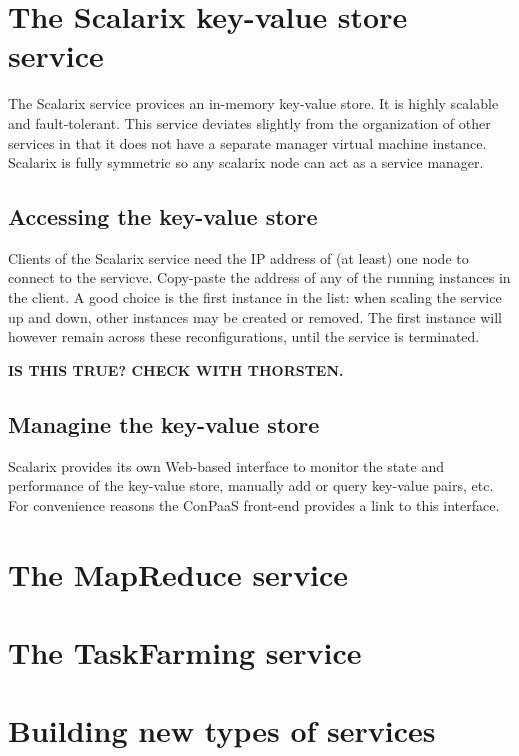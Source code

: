 \documentclass[10pt]{article}
\begin{document}
\section{The Scalarix key-value store service}

The Scalarix service provices an in-memory key-value store. It is
highly scalable and fault-tolerant. This service deviates slightly
from the organization of other services in that it does not have a
separate manager virtual machine instance. Scalarix is fully symmetric
so any scalarix node can act as a service manager.

\subsection{Accessing the key-value store}

Clients of the Scalarix service need the IP address of (at least) one
node to connect to the servicve. Copy-paste the address of any of the
running instances in the client. A good choice is the first instance
in the list: when scaling the service up and down, other instances may
be created or removed. The first instance will however remain across
these reconfigurations, until the service is terminated.

\textbf{IS THIS TRUE? CHECK WITH THORSTEN.}


\subsection{Managine the key-value store}

Scalarix provides its own Web-based interface to monitor the state and
performance of the key-value store, manually add or query key-value
pairs, etc. For convenience reasons the ConPaaS front-end provides a
link to this interface.

\section{The MapReduce service}



\section{The TaskFarming service}

\section{Building new types of services}
\end{document}
